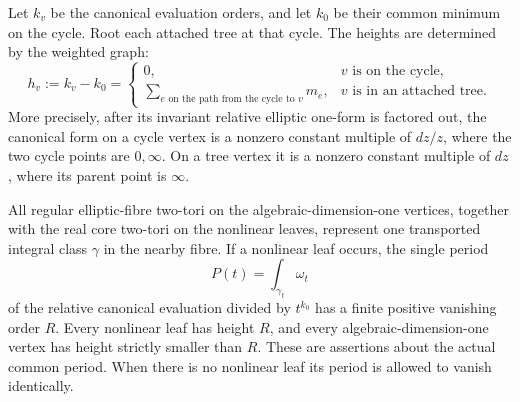 \begin{proposition}
Let $k_v$ be the canonical evaluation orders, and let $k_0$ be their
common minimum on the cycle. Root each attached tree at that cycle.
The heights are determined by the weighted graph:
\[
 h_v:=k_v-k_0=
 \begin{cases}
 0,&v\text{ is on the cycle},\\
 \displaystyle\sum_{e\text{ on the path from the cycle to }v}m_e,
       &v\text{ is in an attached tree}.
 \end{cases}                                           \tag{C.HT.2}\label{cdp:eq:C.HT.2}
\]
More precisely, after its invariant relative elliptic one-form is
factored out, the canonical form on a cycle vertex is a nonzero
constant multiple of $dz/z$, where the two cycle points are
$0,\infty$. On a tree vertex it is a nonzero constant multiple of
$dz$, where its parent point is $\infty$.

All regular elliptic-fibre two-tori on the algebraic-dimension-one
vertices, together with the real core two-tori on the nonlinear
leaves, represent one transported integral class $\gamma$ in the
nearby fibre. If a nonlinear leaf occurs, the single period
\[
                     P(t)=\int_{\gamma_t}\omega_t       \tag{C.HT.3}\label{cdp:eq:C.HT.3}
\]
of the relative canonical evaluation divided by $t^{k_0}$ has a
finite positive vanishing order $R$. Every nonlinear leaf has
height $R$, and every algebraic-dimension-one vertex has height
strictly smaller than $R$. These are assertions about the actual
common period. When there is no nonlinear leaf its period is
allowed to vanish identically.
\end{proposition}

